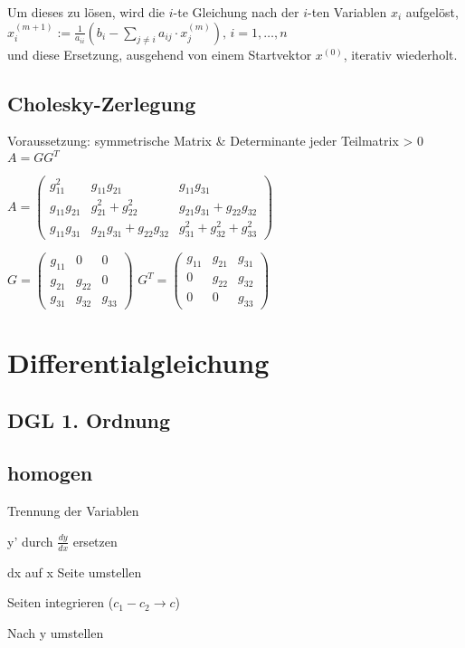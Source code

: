\documentclass[a4paper, 8pt, landscape]{extarticle}
\let\oldsum\sum
\renewcommand{\sum}{\ensuremath{\textstyle\oldsum}}
\begin{document}
\begin{multicols*}{5}
			Um dieses zu lösen, wird die $i$-te Gleichung nach der $i$-ten Variablen $x_i$ aufgelöst,\\
			$x_i^{(m+1)}:=\frac1{a_{ii}}\left(b_i-\sum_{j\not=i} a_{ij}\cdot x_j^{(m)}\right), \, i=1,\dotsc,n$\\
			und diese Ersetzung, ausgehend von einem Startvektor $x^{(0)}$, iterativ wiederholt.
		\subsection{Cholesky-Zerlegung}
			Voraussetzung: symmetrische Matrix \& Determinante jeder Teilmatrix > 0\\
			$A=GG^{T}$\\
			
			\begin{tiny}
				$A=\begin{pmatrix}
					g_{11}^{2} & g_{11}g_{21} & g_{11}g_{31}\\
					g_{11}g_{21} & g_{21}^{2}+g_{22}^{2} & g_{21}g_{31}+g_{22}g_{32}\\
					g_{11}g_{31} & g_{21}g_{31}+g_{22}g_{32} & g_{31}^{2}+g_{32}^{2}+g_{33}^{2}
				\end{pmatrix}$
				\begin{multicols}{2}
					$G=\begin{pmatrix}
						g_{11} & 0 & 0\\
						g_{21} & g_{22} & 0\\
						g_{31} & g_{32} & g_{33}
					\end{pmatrix}$
					$G^{T}=\begin{pmatrix}
						g_{11} & g_{21} & g_{31}\\
						0 & g_{22} & g_{32}\\
						0 & 0 & g_{33}
					\end{pmatrix}$
				\end{multicols}
			\end{tiny}
	\section{Differentialgleichung}
		\subsection{DGL 1. Ordnung}
			\subsection{homogen}
				\begin{compactenum}
					\item Trennung der Variablen
					\item y' durch $\frac{dy}{dx}$ ersetzen
					\item dx auf x Seite umstellen
					\item Seiten integrieren ($c_1-c_2\rightarrow c$)
					\item Nach y umstellen
				\end{compactenum}	

\end{multicols*}
\end{document}
